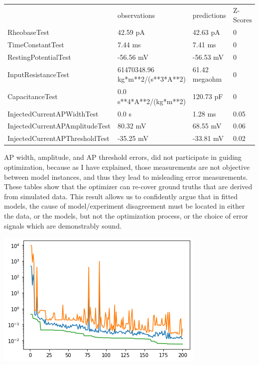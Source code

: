 \begin{tabular}{llll}
{} &                     observations &    predictions & Z-Scores \\
RheobaseTest                   &                         42.59 pA &       42.63 pA &        0 \\
TimeConstantTest               &                          7.44 ms &        7.41 ms &        0 \\
RestingPotentialTest           &                        -56.56 mV &      -56.53 mV &        0 \\
InputResistanceTest            &  61470348.96 kg*m**2/(s**3*A**2) &  61.42 megaohm &        0 \\
CapacitanceTest                &          0.0 s**4*A**2/(kg*m**2) &      120.73 pF &        0 \\
InjectedCurrentAPWidthTest     &                            0.0 s &        1.28 ms &     0.05 \\
InjectedCurrentAPAmplitudeTest &                         80.32 mV &       68.55 mV &     0.06 \\
InjectedCurrentAPThresholdTest &                        -35.25 mV &      -33.81 mV &     0.02 \\
\end{tabular}

AP width, amplitude, and AP threshold errors, did not participate in guiding optimization, because as I have explained, those measurements are not objective between model instances, and thus they lead to misleading error measurements. These tables show that the optimizer can re-cover ground truths that are derived from simulated data. This result allows us to confidently argue that in fitted models, the cause of model/experiment disagreement must be located in either the data, or the models, but not the optimization process, or the choice of error signals which are demonstrably sound.


\includegraphics[]{figures/simulated_convergence_performance.png}

